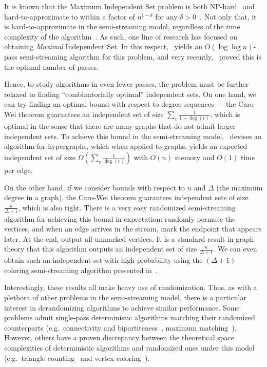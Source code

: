 \documentclass[11pt]{article}
\begin{document}
It is known that the Maximum Independent Set problem is both NP-hard\ \cite{karp2010reducibility} and hard-to-approximate to within a factor of $n^{1-\delta}$ for any $\delta>0$\ \cite{zuckerman2006linear}. Not only that, it is hard-to-approximate in the semi-streaming model, regardless of the time complexity of the algorithm\ \cite{halldorsson2012streaming}. As such, one line of research has focused on obtaining \textit{Maximal} Independent Set. In this respect,~\cite{ahn2015correlation} yields an $O(\log \log n)$-pass semi-streaming algorithm for this problem, and very recently,\ \cite{assadi2024log} proved this is the optimal number of passes.
\vspace{-0.05cm}

Hence, to study algorithms in even fewer passes, the problem must be further relaxed to finding ``combinatorially optimal'' independent sets. On one hand, we can try finding an optimal bound with respect to degree sequences --- the Caro-Wei theorem guarantees an independent set of size $\sum_{v}\frac 1{1+\deg(v)}$, which is optimal in the sense that there are many graphs that do not admit larger independent sets. To achieve this bound in the semi-streaming model,~\cite{halldorsson2010streaming} devises an algorithm for hypergraphs, which when applied to graphs, yields an expected independent set of size $\Omega\left(\sum_{v}\frac 1{\deg(v)}\right)$ with $O(n)$ memory and $O(1)$ time per edge. 
\vspace{-0.05cm}

On the other hand, if we consider bounds with respect to $n$ and $\Delta$ (the maximum degree in a graph), the Caro-Wei theorem guarantees independent sets of size $\frac{n}{\Delta+1}$, which is also tight. There is a very easy randomized semi-streaming algorithm for achieving this bound in expectation: randomly permute the vertices, and when an edge arrives in the stream, mark the endpoint that appears later. At the end, output all unmarked vertices. It is a standard result in graph theory that this algorithm outputs an independent set of size $\frac n{\Delta+1}$. We can even obtain such an independent set with high probability using the $(\Delta+1)$-coloring semi-streaming algorithm presented in~\cite{assadi2019sublinear}.
\vspace{-0.05cm}

Interestingly, these results all make heavy use of randomization. Thus, as with a plethora of other problems in the semi-streaming model, there is a particular interest in derandomizing algorithms to achieve similar performance. Some problems admit single-pass deterministic algorithms matching their randomized counterparts (e.g.\ connectivity and bipartiteness~\cite{ahn2012analyzing}, maximum matching~\cite{paz20182+}). However, others have a proven discrepancy between the theoretical space complexities of deterministic algorithms and randomized ones under this model (e.g.\ triangle counting~\cite{braverman2013hard} and vertex coloring~\cite{assadi2022deterministic}). 
\vspace{-0.05cm}
\end{document}

